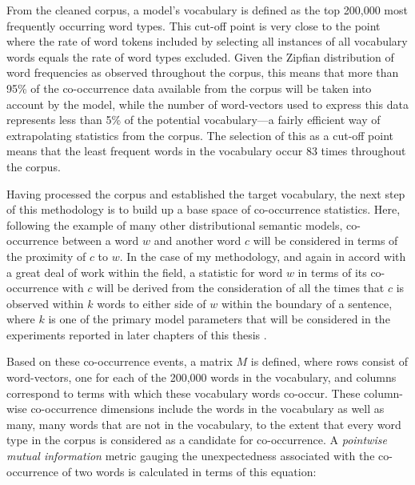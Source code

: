 From the cleaned corpus, a model's vocabulary is defined as the top 200,000 most frequently occurring word types.  This cut-off point is very close to the point where the rate of word tokens included by selecting all instances of all vocabulary words equals the rate of word types excluded.  Given the Zipfian distribution of word frequencies as observed throughout the corpus, this means that more than 95\% of the co-occurrence data available from the corpus will be taken into account by the model, while the number of word-vectors used to express this data represents less than 5\% of the potential vocabulary---a fairly efficient way of extrapolating statistics from the corpus.  The selection of this as a cut-off point means that the least frequent words in the vocabulary occur 83 times throughout the corpus.

Having processed the corpus and established the target vocabulary, the next step of this methodology is to build up a base space of co-occurrence statistics.  Here, following the example of many other distributional semantic models, co-occurrence between a word $w$ and another word $c$ will be considered in terms of the proximity of $c$ to $w$.  In the case of my methodology, and again in accord with a great deal of work within the field, a statistic for word $w$ in terms of its co-occurrence with $c$ will be derived from the consideration of all the times that $c$ is observed within $k$ words to either side of $w$ within the boundary of a sentence, where $k$ is one of the primary model parameters that will be considered in the experiments reported in later chapters of this thesis .   \cite{KielaEA2014} 

Based on these co-occurrence events, a matrix $M$ is defined, where rows consist of word-vectors, one for each of the 200,000 words in the vocabulary, and columns correspond to terms with which these vocabulary words co-occur.  These column-wise co-occurrence dimensions include the words in the vocabulary as well as many, many words that are not in the vocabulary, to the extent that every word type in the corpus is considered as a candidate for co-occurrence.    A \emph{pointwise mutual information} metric gauging the unexpectedness associated with the co-occurrence of two words is calculated in terms of this equation:

